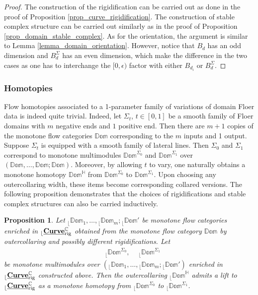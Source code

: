 \documentclass[reqno, 10pt]{amsart}
\numberwithin{equation}{section}
\numberwithin{equation}{section}
\newtheorem{prop}[thm]{Proposition}
\theoremstyle{definition}
\theoremstyle{remark}
\newcommand{\mb}{\mathbb}
\renewcommand{\outer}{{}_{\lfloor}}
\newcommand{\uds}[1]{\underline{\smash{#1}}}
\begin{document}
\begin{proof}
The construction of the rigidification can be carried out as done in the proof of Proposition \ref{prop_curve_rigidification}. The construction of stable complex structure can be carried out similarly as in the proof of Proposition \ref{prop_domain_stable_complex}. As for the orientation, the argument is similar to Lemma \ref{lemma_domain_orientation}. However, notice that $B_d$ has an odd dimension and $B_d^\Sigma$ has an even dimension, which make the difference in the two cases as one has to interchange the $[0, \epsilon)$ factor with either $B_{d_i}$ or $B_d^\Sigma$. 
\end{proof}


















\subsubsection{Homotopies}

Flow homotopies associated to a 1-parameter family of variations of domain Floer data is indeed quite trivial. Indeed, let $\Sigma_t$, $t \in [0, 1]$ be a smooth family of Floer domains with $m$ negative ends and $1$ positive end. Then there are $m+1$ copies of the monotone flow categories $\mb{Dom}$ corresponding to the $m$ inputs and 1 output. Suppose $\Sigma_t$ is equipped with a smooth family of lateral lines. Then $\Sigma_0$ and $\Sigma_1$ correspond to monotone multimodules $\mb{Dom}^{\Sigma_0}$ and $\mb{Dom}^{\Sigma_1}$ over $(\mb{Dom}, \ldots, \mb{Dom}; \mb{Dom})$. Moreover, by allowing $t$ to vary, one naturally obtains a monotone homotopy $\mb{Dom}^{\mb H}$ from $\mb{Dom}^{\Sigma_0}$ to $\mb{Dom}^{\Sigma_1}$. Upon choosing any outercollaring width, these items become corresponding collared versions. The following proposition demonstrates that the choices of rigidifications and stable complex structures can also be carried inductively. 

\begin{prop}
Let $\outer\mb{Dom}_1, \ldots, \outer \mb{Dom}_m; \outer\mb{Dom}'$ be monotone flow categories enriched in $\outer \uds{\bf Curve}_{\rm rig}^{\mb C}$ obtained from the monotone flow category $\mb{Dom}$ by outercollaring and possibly different rigidifications. Let 
\begin{align*}
&\ \outer \mb{Dom}^{\Sigma_0},\ &\ \outer \mb{Dom}^{\Sigma_1}
\end{align*}
be monotone multimodules over $(\outer \mb{Dom}_1, \ldots, \outer \mb{Dom}_m; \outer \mb{Dom}')$ enriched in $\outer \uds{\bf Curve}_{\rm rig}^{\mb C}$ constructed above. Then the outercollaring $\outer \mb{Dom}^{\mb H}$ admits a lift to $\outer \uds{\bf Curve}_{\rm rig}^{\mb C}$ as a monotone homotopy from $\outer \mb{Dom}^{\Sigma_0}$ to $\outer \mb{Dom}^{\Sigma_1}$.
\end{prop}
\end{document}
